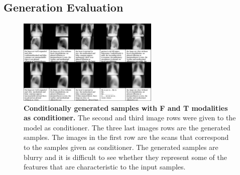     \subsection{Generation Evaluation}

    \begin{frame}
    \end{frame}

    \begin{frame}
        \begin{figure}
            \centering
            \includegraphics[width=0.6\textwidth, height = \textheight, keepaspectratio]{data/cond_gen/Lateral_text}
                \caption{\tiny{
        \textbf{Conditionally generated samples with F and T modalities as conditioner.} The second and third image rows were given to the model as conditioner. The three last images rows are the generated samples. The images in the first row are the scans that correspond to the samples given as conditioner. The generated samples are blurry and it is difficult to see whether they represent some of the features that are characteristic to the input samples.
    }}
        \end{figure}
    \end{frame}

